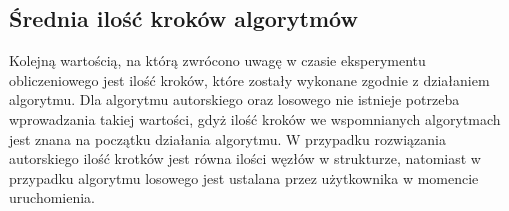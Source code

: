 \subsection{Średnia ilość kroków algorytmów}

Kolejną wartością, na którą zwrócono uwagę w czasie eksperymentu
obliczeniowego jest ilość kroków, które zostały wykonane zgodnie
z działaniem algorytmu. Dla algorytmu autorskiego oraz losowego
nie istnieje potrzeba wprowadzania takiej wartości, gdyż ilość
kroków we wspomnianych algorytmach jest znana na początku działania
algorytmu. W przypadku rozwiązania autorskiego ilość krotków jest
równa ilości węzłów w strukturze, natomiast w przypadku algorytmu
losowego jest ustalana przez użytkownika w momencie uruchomienia.
